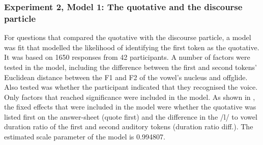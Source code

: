 \subsubsection{Experiment 2, Model 1: The quotative and the discourse particle}

For questions that compared the quotative with the discourse particle, a model was fit that modelled the likelihood of identifying the first token as the quotative. It was based on 1650 responses from 42 participants. A number of factors were tested in the model, including the difference between the first and second tokens' Euclidean distance between the F1 and F2 of the vowel's nucleus and offglide. Also tested was whether the participant indicated that they recognised the voice. Only factors that reached significance were included in the model. As shown in , the fixed effects that were included in the model were whether the quotative was listed first on the answer-sheet (quote first) and the difference in the /l/ to vowel duration ratio of the first and second auditory tokens (duration ratio diff.). The estimated scale parameter of the model is 0.994807. 



